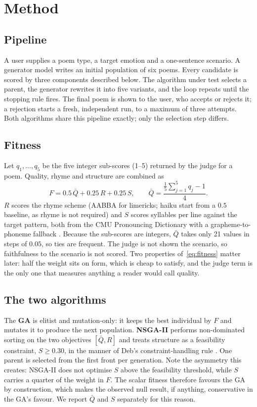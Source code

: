 \documentclass[conference]{IEEEtran}
\newcommand{\Qb}{\bar{Q}}
\begin{document}
\section{Method}
\subsection{Pipeline}
A user supplies a poem type, a target emotion and a one-sentence scenario. A
generator model writes an initial population of six poems. Every candidate is
scored by three components described below. The algorithm under test selects a
parent, the generator rewrites it into five variants, and the loop repeats until
the stopping rule fires. The final poem is shown to the user, who accepts or
rejects it; a rejection starts a fresh, independent run, to a maximum of three
attempts. Both algorithms share this pipeline exactly; only the selection step
differs.

\subsection{Fitness}
Let $q_1,\dots,q_5$ be the five integer sub-scores (1--5) returned by the judge
for a poem. Quality, rhyme and structure are combined as
\begin{equation}
F = 0.5\,\Qb + 0.25\,R + 0.25\,S, \qquad
\Qb = \frac{\frac{1}{5}\sum_{j=1}^{5} q_j - 1}{4}.
\label{eq:fitness}
\end{equation}
$R$ scores the rhyme scheme (AABBA for limericks; haiku start from a $0.5$
baseline, as rhyme is not required) and $S$ scores syllables per line against the
target pattern, both from the CMU Pronouncing Dictionary \cite{cmudict} with a
grapheme-to-phoneme fallback \cite{park2019g2p}. Because the sub-scores are
integers, $\Qb$ takes only 21 values in steps of $0.05$, so ties are frequent.
The judge is not shown the scenario, so faithfulness to the scenario is not
scored. Two properties of~\eqref{eq:fitness} matter later: half the weight sits on
form, which is cheap to satisfy, and the judge term is the only one that measures
anything a reader would call quality.

\subsection{The two algorithms}
The \textbf{GA} is elitist and mutation-only: it keeps the best individual by $F$
and mutates it to produce the next population.
\textbf{NSGA-II} \cite{deb2002} performs non-dominated sorting on the two
objectives $[\Qb, R]$ and treats structure as a feasibility constraint,
$S \ge 0.30$, in the manner of Deb's constraint-handling rule
\cite{deb2000constraint}. One parent is selected from the first front per
generation. Note the asymmetry this creates: NSGA-II does not optimise $S$ above
the feasibility threshold, while $S$ carries a quarter of the weight in $F$. The
scalar fitness therefore favours the GA by construction, which makes the observed
null result, if anything, conservative in the GA's favour. We report $\Qb$ and
$S$ separately for this reason.
\end{document}
